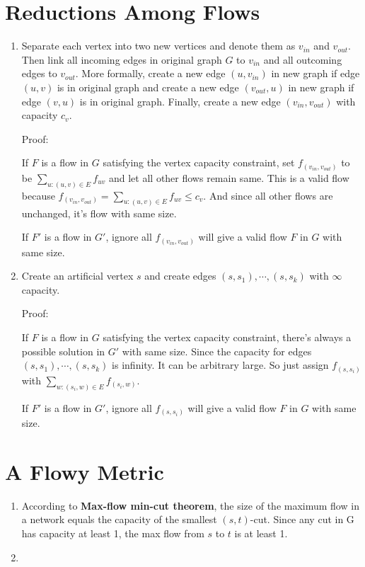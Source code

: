 \documentclass[11pt]{article}
\newenvironment{qparts}{\begin{enumerate}[{(}a{)}]}{\end{enumerate}}
\begin{document}
\section{Reductions Among Flows}
\begin{qparts}
	
	\item 

	Separate each vertex into two new vertices and denote them as $v_{in}$ and $v_{out}$. Then link all incoming edges in original graph $G$ to $v_{in}$ and all outcoming edges to $v_{out}$. More formally, create a new edge $(u, v_{in})$ in new graph if edge $(u, v)$ is in original graph and create a new edge $(v_{out}, u)$ in new graph if edge $(v, u)$ is in original graph. Finally, create a new edge $(v_{in}, v_{out})$ with capacity $c_v$.
	
	Proof:
	
	If $F$ is a flow in $G$ satisfying the vertex capacity constraint, set $f_{(v_{in}, v_{out})}$ to be $\sum_{u:(u, v)\in E} f_{uv}$ and let all other flows remain same. This is a valid flow because $f_{(v_{in}, v_{out})} = \sum_{u:(u, v)\in E} f_{uv} \le c_v$. And since all other flows are unchanged, it's flow with same size.
	
	If $F\prime$ is a flow in $G\prime$, ignore all $f_{(v_{in}, v_{out})}$ will give a valid flow $F$ in $G$ with same size.

	\item 

	Create an artificial vertex $s$ and create edges $(s, s_1), \cdots, (s, s_k)$ with $\infty$ capacity.
	
	Proof:
	
	If $F$ is a flow in $G$ satisfying the vertex capacity constraint, there's always a possible solution in $G\prime$ with same size. Since the capacity for edges $(s, s_1), \cdots, (s, s_k)$ is infinity. It can be arbitrary large. So just assign $f_{(s, s_i)}$ with $\sum_{w:(s_i, w) \in E}f_{(s_i, w)}$.
	
	If $F\prime$ is a flow in $G\prime$, ignore all $f_{(s, s_i)}$ will give a valid flow $F$ in $G$ with same size.	
		
\end{qparts}
\newpage
\section{A Flowy Metric}
\begin{qparts}
	
	\item 

	According to \textbf{Max-flow min-cut theorem}, the size of the maximum flow in a network equals the capacity of the smallest $(s, t)$-cut. Since any cut in G has capacity at least 1, the max flow from $s$ to $t$ is at least 1.
	
	\item
		
\end{qparts}
\end{document}
